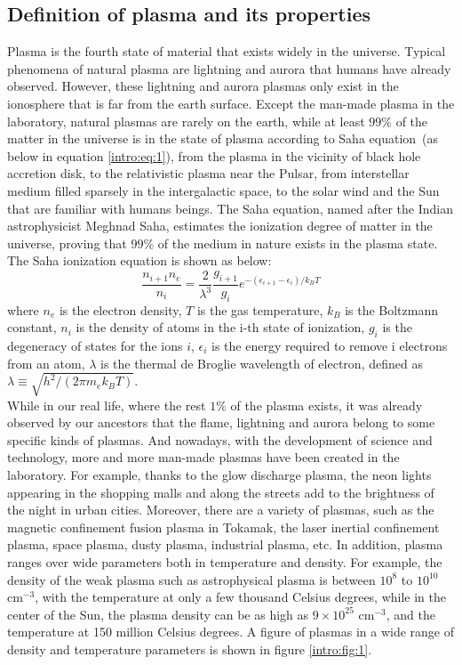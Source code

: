 \subsection{Definition of plasma and its properties}
Plasma is the fourth state of material that exists widely in the universe. Typical phenomena of natural plasma are lightning and aurora that humans have already observed. However, these lightning and aurora plasmas only exist in the ionosphere that is far from the earth surface. Except the man-made plasma in the laboratory, natural plasmas are rarely on the earth, while at least $99\%$ of the matter in the universe is in the state of plasma according to Saha equation~\cite{chen1986plasma,saha1920ionisation}(as below in equation \ref{intro:eq:1}), from the plasma in the vicinity of black hole accretion disk, to the relativistic plasma near the Pulsar, from interstellar medium filled sparsely in the intergalactic space, to the solar wind and the Sun that are familiar with humans beings. The Saha equation, named after the Indian astrophysicist Meghnad Saha, estimates the ionization degree of matter in the universe, proving that $99\%$ of the medium in nature exists in the plasma state. The Saha ionization equation is shown as below:
\begin{equation}\label{intro:eq:1}
\frac{n_{i+1}n_e}{n_i} = \frac{2}{\lambda^3}\frac{g_{i+1}}{g_i}e^{-(\epsilon_{i+1}-\epsilon_i)/k_BT}
\end{equation}
where $n_e$ is the electron density, $T$ is the gas temperature, $k_B$ is the Boltzmann constant, $n_i$ is the density of atoms in the i-th state of ionization, $g_i$ is the degeneracy of states for the ions $i$, $\epsilon_i$ is the energy required to remove i electrons from an atom, $\lambda$ is the thermal de Broglie wavelength of electron, defined as $\lambda \equiv\sqrt{h^2/(2\pi m_ek_BT)}$.\\[12pt]
While in our real life, where the rest $1\%$ of the plasma exists, it was already observed by our ancestors that the flame, lightning and aurora belong to some specific kinds of plasmas. And nowadays, with the development of science and technology, more and more man-made plasmas have been created in the laboratory. For example, thanks to the glow discharge plasma, the neon lights appearing in the shopping malls and along the streets add to the brightness of the night in urban cities. Moreover, there are a variety of plasmas, such as the magnetic confinement fusion plasma in Tokamak, the laser inertial confinement plasma, space plasma, dusty plasma, industrial plasma, etc. In addition, plasma ranges over wide parameters both in temperature and density. For example, the density of the weak plasma such as astrophysical plasma is between $10^8$ to $10^{10}$ $\text{cm}^{-3}$, with the temperature at only a few thousand Celsius degrees, while in the center of the Sun, the plasma density can be as high as $9\times10^{25}$ $\text{cm}^{-3}$, and the temperature at 150 million Celsius degrees. A figure of plasmas in a wide range of density and temperature parameters is shown in figure \ref{intro:fig:1}.
